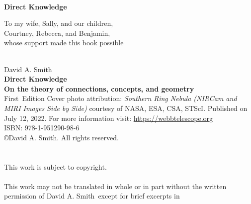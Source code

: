\def\authname{David A. Smith}
\def\website{https://directknowledge.com}
\def\cred{B.S. Mathematics, M.S. Mathematics}
\def\firstTitle{Direct Knowledge}
\def\secondTitle{On the theory of connections, concepts, and geometry}
\def\publisher{David A. Smith}
\def\isbn{978-1-951290-98-6}
\def\edition{First}
\def\dedication{To my wife, Sally, and our children, \\[10pt] Courtney, Rebecca, and Benjamin, \\[10pt] whose support made this book possible}
\def\cover{Cover photo attribution: \textit{Southern Ring Nebula (NIRCam and MIRI Images Side by Side)} courtesy of NASA, ESA, CSA, STScI. Published on July 12, 2022. For more information visit: \url{https://webbtelescope.org}}


\begin{titlepage}
\pagestyle{empty}\text{ }\\[1in]\begin{center} \Huge \textbf{\sc \firstTitle} \end{center}
\newpage \text{ }\vspace{1in}\begin{center}\begin{minipage}{.85\textwidth}\dedication \vfill\vfill\vfill\text{ }\end{minipage}\end{center}
\clearpage \text{ }\\[30pt]
\noindent\Large \authname \\[50pt]
\noindent\Huge \textbf{\firstTitle} \\[20pt]
\noindent\Large\textbf{\secondTitle} 
\\[25pt]\noindent\large\edition \ Edition
\vfill
\newpage\footnotesize\noindent\cover \vfill \text{ } \\[7pt]
ISBN: \isbn \\[10pt]
\copyright \authname. 
All rights reserved. \\ \\ \\ 
This work is subject to copyright. \\ \\ 
This work may not be translated in whole or in part without the written permission of \publisher\ except for brief excerpts in 

\end{titlepage}
